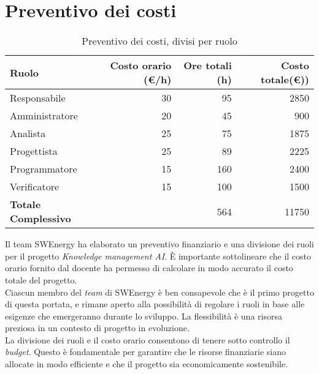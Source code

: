 \section{Preventivo dei costi}

\begin{table}[H]
	\renewcommand{\arraystretch}{1.5}
	\centering
	\begin{tabular}{l|r|r|r}
		\textbf{Ruolo} & \textbf{Costo orario (\euro/h)} & \textbf{Ore totali (h)} & 
		\textbf{Costo totale(\euro))} \\
		\hline
		Responsabile				&	 30 &  95 &	 2850			\\
		Amministratore				&	 20 &  45 &   900  			\\
		Analista					&	 25 &  75 &  1875			\\
		Progettista					&	 25 &  89 &  2225			\\
		Programmatore				&	 15 & 160 &  2400			\\
		Verificatore				&	 15 & 100 &  1500			\\
		\hline
		\textbf{Totale Complessivo} &		& 564 &	11750			\\
	\end{tabular}
	\caption{Preventivo dei costi, divisi per ruolo}

\end{table}

Il team SWEnergy ha elaborato un preventivo finanziario e una divisione dei
ruoli per il progetto \textit{Knowledge management AI}. È importante 
sottolineare che il costo orario fornito dal docente ha permesso di calcolare 
in modo accurato il costo totale del progetto. \\

\noindent
Ciascun membro del \textit{team} di SWEnergy è ben consapevole che è il primo
progetto di questa portata, e 
rimane aperto alla possibilità di regolare i ruoli in base alle esigenze che 
emergeranno durante lo sviluppo. La flessibilità è una risorsa preziosa in un 
contesto di progetto in evoluzione. \\
La divisione dei ruoli e il costo orario consentono di tenere sotto controllo il
\textit{budget}. Questo è fondamentale per garantire che le risorse finanziarie siano 
allocate in modo efficiente e che il progetto sia economicamente sostenibile.
